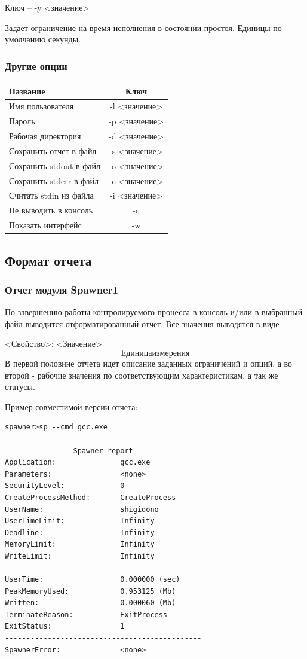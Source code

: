 \documentclass{imcs}
\begin{document}
Ключ -- -y <значение>

Задает ограничение на время исполнения в состоянии простоя. Единицы по-умолчанию секунды.
\subsubsection{Другие опции}
\begin{table}[h!]
\begin{center}
\begin{tabular}{|l|c|}
\hline
Название & Ключ\\
\hline
Имя пользователя & -l <значение>\\
\hline
Пароль & -p <значение>\\
\hline
Рабочая директория & -d <значение>\\
\hline
Сохранить отчет в файл & -s <значение>\\
\hline
Сохранить stdout в файл & -o <значение>\\
\hline
Сохранить stderr в файл & -e <значение>\\
\hline
Считать stdin из файла & -i <значение>\\
\hline
Не выводить в консоль & -q\\
\hline
Показать интерфейс & -w\\
\hline
\end{tabular}
\end{center}
\end{table}
\subsection{Формат отчета}
\subsubsection{Отчет модуля Spawner1}
По завершению работы контролируемого процесса в консоль и/или в выбранный файл выводится отформатированный отчет.
Все значения выводятся в виде

<Свойство>:   <Значение>\[ Единица измерения\]
В первой половине отчета идет описание заданных ограничений и опций, а во второй - рабочие значения по соответствующим характеристикам, а так же статусы.

Пример совместимой версии отчета:
\begin{lstlisting}
spawner>sp --cmd gcc.exe

--------------- Spawner report ---------------
Application:               gcc.exe
Parameters:                <none>
SecurityLevel:             0
CreateProcessMethod:       CreateProcess
UserName:                  shigidono
UserTimeLimit:             Infinity
Deadline:                  Infinity
MemoryLimit:               Infinity
WriteLimit:                Infinity
----------------------------------------------
UserTime:                  0.000000 (sec)
PeakMemoryUsed:            0.953125 (Mb)
Written:                   0.000060 (Mb)
TerminateReason:           ExitProcess
ExitStatus:                1
----------------------------------------------
SpawnerError:              <none>
\end{lstlisting}
\end{document}
